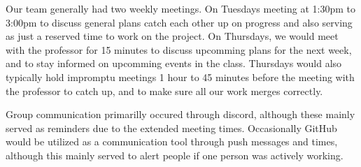 




Our team generally had two weekly meetings. On Tuesdays meeting at 1:30pm to 3:00pm
to discuss general plans catch each other up on progress and also serving as just a
reserved time to work on the project. On Thursdays, we would meet with the professor
for 15 minutes to discuss upcomming plans for the next week, and to stay informed on
upcomming events in the class. Thursdays would also typically hold impromptu meetings
1 hour to 45 minutes before the meeting with the professor to catch up, and to make
sure all our work merges correctly.\par

Group communication primarilly occured through discord, although these mainly served
as reminders due to the extended meeting times. Occasionally GitHub would be utilized
as a communication tool through push messages and times, although this mainly served
to alert people if one person was actively working.
